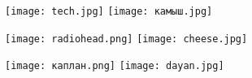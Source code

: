 \noindent
\texttt{[image: tech.jpg]}
\hfill
\texttt{[image: камыш.jpg]}

\vspace{6mm}
\noindent
\texttt{[image: radiohead.png]}
\hfill
\texttt{[image: cheese.jpg]}

\vspace{6mm}
\noindent
\texttt{[image: каплан.png]}
\hfill
\texttt{[image: dayan.jpg]}
\vfill